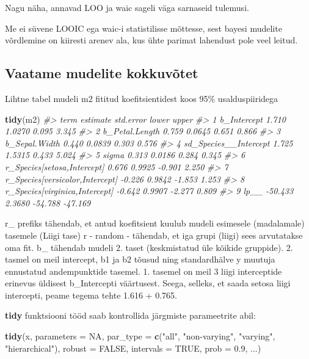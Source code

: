 \documentclass[]{book}
\newenvironment{Shaded}{\begin{snugshade}}{\end{snugshade}}
\newcommand{\KeywordTok}[1]{\textcolor[rgb]{0.13,0.29,0.53}{\textbf{#1}}}
\newcommand{\DataTypeTok}[1]{\textcolor[rgb]{0.13,0.29,0.53}{#1}}
\newcommand{\FloatTok}[1]{\textcolor[rgb]{0.00,0.00,0.81}{#1}}
\newcommand{\StringTok}[1]{\textcolor[rgb]{0.31,0.60,0.02}{#1}}
\newcommand{\CommentTok}[1]{\textcolor[rgb]{0.56,0.35,0.01}{\textit{#1}}}
\newcommand{\OtherTok}[1]{\textcolor[rgb]{0.56,0.35,0.01}{#1}}
\newcommand{\NormalTok}[1]{#1}
\begin{document}
Nagu näha, annavad LOO ja waic sageli väga sarnaseid tulemusi.

Me ei süvene LOOIC ega waic-i statistilisse mõttesse, sest bayesi
mudelite võrdlemine on kiiresti arenev ala, kus ühte parimat lahendust
pole veel leitud.

\subsection{Vaatame mudelite
kokkuvõtet}\label{vaatame-mudelite-kokkuvotet}

Lihtne tabel mudeli m2 fititud koefitsientidest koos 95\%
usalduspiiridega

\begin{Shaded}
\begin{Highlighting}[]
\KeywordTok{tidy}\NormalTok{(m2)}
\CommentTok{#>                              term estimate std.error   lower   upper}
\CommentTok{#> 1                     b_Intercept    1.710    1.0270   0.095   3.345}
\CommentTok{#> 2                  b_Petal.Length    0.759    0.0645   0.651   0.866}
\CommentTok{#> 3                   b_Sepal.Width    0.440    0.0839   0.303   0.576}
\CommentTok{#> 4           sd_Species__Intercept    1.725    1.5315   0.433   5.024}
\CommentTok{#> 5                           sigma    0.313    0.0186   0.284   0.345}
\CommentTok{#> 6     r_Species[setosa,Intercept]    0.676    0.9925  -0.901   2.250}
\CommentTok{#> 7 r_Species[versicolor,Intercept]   -0.226    0.9842  -1.853   1.253}
\CommentTok{#> 8  r_Species[virginica,Intercept]   -0.642    0.9907  -2.277   0.809}
\CommentTok{#> 9                            lp__  -50.433    2.3680 -54.788 -47.169}
\end{Highlighting}
\end{Shaded}

r\_ prefiks tähendab, et antud koefitsient kuulub mudeli esimesele
(madalamale) tasemele (Liigi tase) r - random - tähendab, et iga grupi
(liigi) sees arvutatakse oma fit. b\_ tähendab mudeli 2. taset
(keskmistatud üle kõikide gruppide). 2. tasmel on meil intercept, b1 ja
b2 tõusud ning standardhälve y muutuja ennustatud andempunktide tasemel.
1. tasemel on meil 3 liigi interceptide erinevus üldisest b\_Intercepti
väärtusest. Seega, selleks, et saada setosa liigi intercepti, peame
tegema tehte 1.616 + 0.765.

\textbf{tidy} funktsiooni tööd saab kontrollida järgmiste parameetrite
abil:

\begin{Shaded}
\begin{Highlighting}[]
\KeywordTok{tidy}\NormalTok{(x, }\DataTypeTok{parameters =} \OtherTok{NA}\NormalTok{, }\DataTypeTok{par_type =} \KeywordTok{c}\NormalTok{(}\StringTok{"all"}\NormalTok{,}
  \StringTok{"non-varying"}\NormalTok{, }\StringTok{"varying"}\NormalTok{, }\StringTok{"hierarchical"}\NormalTok{), }\DataTypeTok{robust =} \OtherTok{FALSE}\NormalTok{,}
  \DataTypeTok{intervals =} \OtherTok{TRUE}\NormalTok{, }\DataTypeTok{prob =} \FloatTok{0.9}\NormalTok{, ...)}
\end{Highlighting}
\end{Shaded}
\end{document}
